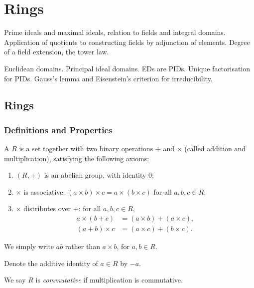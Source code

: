 \chapter{Rings}\label{chap:rings}
\begin{summary}
\item Prime ideals and maximal ideals, relation to fields and integral domains. Application of quotients to constructing fields by adjunction of elements. Degree of a field extension, the tower law.
\item Euclidean domains. Principal ideal domains. EDs are PIDs. Unique factorisation for PIDs. Gauss's lemma and Eisenstein's criterion for irreducibility.
\end{summary}

\section{Rings}
\subsection{Definitions and Properties}
\begin{definition}[Ring]
A  $R$ is a set together with two binary operations $+$ and $\times$ (called addition and multiplication), satisfying the following axioms:
\begin{enumerate}[label=(\roman*)]
\item $(R,+)$ is an abelian group, with identity $0$;
\item $\times$ is associative: $(a\times b)\times c=a\times(b\times c)$ for all $a,b,c\in R$;
\item $\times$ distributes over $+$: for all $a,b,c\in R$,
\begin{align*}
a\times(b+c)&=(a\times b)+(a\times c),\\
(a+b)\times c&=(a\times c)+(b\times c).
\end{align*}
\end{enumerate}
\end{definition}

\begin{notation}
We simply write $ab$ rather than $a\times b$, for $a,b\in R$.
\end{notation}

\begin{notation}
Denote the additive identity of $a\in R$ by $-a$.
\end{notation}

We say $R$ is \emph{commutative} if multiplication is commutative.

